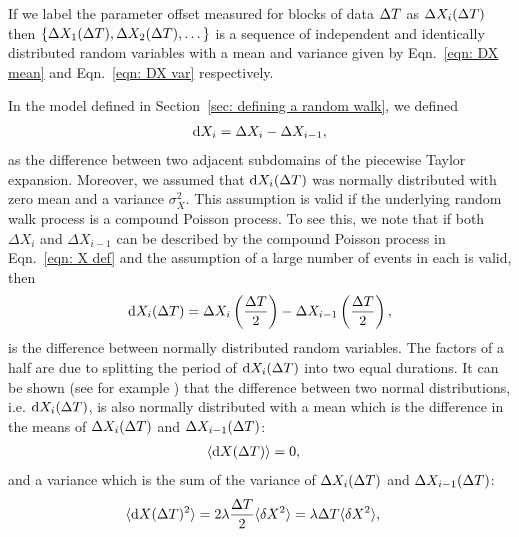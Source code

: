 \documentclass[../full_thesis/full_thesis.tex]{subfiles}
\begin{document}
If we label the parameter offset measured for blocks of data $\Delta T$ as  $\Delta
X_{i}(\Delta T)$ then $\{\Delta X_{1}(\Delta T), \Delta X_{2}(\Delta T), \dots\}$ is a
sequence of independent and identically distributed random variables with a mean
and variance given by Eqn.~\eqref{eqn: DX mean} and Eqn.~\eqref{eqn: DX var}
respectively.

In the model defined in Section~\ref{sec: defining a random walk}, we defined
\begin{align}
\mathrm{d} X_{i} = \Delta X_{i} - \Delta X_{i-1},
\end{align}
as the difference between two adjacent subdomains of the piecewise Taylor
expansion. Moreover, we assumed that $\mathrm{d} X_i(\Delta T)$ was normally distributed
with zero mean and a variance $\sigma_{X}^{2}$.  This assumption is valid if
the underlying random walk process is a compound Poisson process. To see this,
we note that if both $\Delta X_{i}$ and $\Delta X_{i-1}$ can be described by
the compound Poisson process in Eqn.~\eqref{eqn: X def} and the assumption of
a large number of events in each is valid, then
\begin{align}
\mathrm{d} X_{i}(\Delta T) =  \Delta X_{i}\left(\frac{\Delta T}{2}\right)
                - \Delta X_{i-1}\left(\frac{\Delta T}{2}\right),
\end{align}
is the difference between normally distributed random variables. The factors of
a half are due to splitting the period of $\mathrm{d} X_i(\Delta T)$ into two equal
durations. It can be shown (see for example \citeauthor{wolframdifference})
that the difference between two normal distributions, i.e. $\mathrm{d} X_i (\Delta T)$, is
also normally distributed with a mean which is the difference in the means of
$\Delta X_{i}(\Delta T)$ and $\Delta X_{i-1}(\Delta T)$:
\begin{align}
\langle \mathrm{d} X(\Delta T) \rangle & = 0,
\label{eqn: Poisson expectation}
\end{align}
and a variance which is the sum of the variance of
$\Delta X_{i}(\Delta T)$ and $\Delta X_{i-1}(\Delta T)$:
\begin{align}
\langle \mathrm{d} X(\Delta T)^{2} \rangle &  =
2 \lambda \frac{\Delta T}{2} \langle \delta X^{2}\rangle
= \lambda \Delta T \langle \delta X^{2}\rangle,
\label{eqn: Poisson variance}
\end{align}
\end{document}
